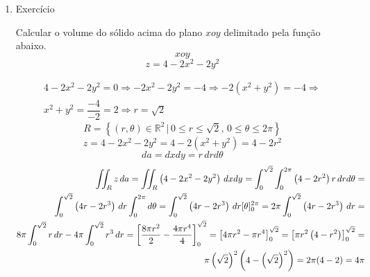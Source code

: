 \begin{enumerate}
	\item Exercício
	
	Calcular o volume do sólido acima do plano $xoy$ delimitado pela função abaixo.
	\begin{equation*}
		xoy
	\end{equation*}
	\begin{equation*}
		z = 4 - 2x^2 - 2y^2
	\end{equation*}
	
	\begin{align*}
		4 - 2x^2 - 2y^2 = 0 \Rightarrow -2x^2 - 2y^2 = - 4 \Rightarrow - 2\left(x^2 + y^2\right) = -4 \Rightarrow\\ x^2 + y^2 = \dfrac{-4}{-2} = 2 \Rightarrow r = \sqrt{2}
	\end{align*}
	\begin{equation*}
		R = \left\{(r, \theta) \in \mathbb{R}^2 \,|\, 0 \leq r \leq \sqrt{2},\, 0 \leq \theta \leq 2\pi\right\}
	\end{equation*}
	\begin{equation*}
		z = 4 - 2x^2 - 2y^2 = 4 - 2\left(x^2 + y^2\right) = 4 - 2r^2
	\end{equation*}
	\begin{equation*}
		da = dxdy = r\, drd\theta
	\end{equation*}
	\begin{align*}
		\iint_R z\, da = \iint_R \left(4 - 2x^2 - 2y^2\right)\, dxdy = \int_0^{\sqrt{2}} \int_0^{2\pi} \left(4 - 2r^2\right) r\, drd\theta =\\ \int_0^{\sqrt{2}} \left(4r - 2r^3\right) \, dr \int_0^{2\pi} d\theta = \int_0^{\sqrt{2}} \left(4r - 2r^3\right) \, dr [\theta]_0^{2\pi} = 2\pi\int_0^{\sqrt{2}} \left(4r - 2r^3\right) \, dr =\\ 8\pi\int_0^{\sqrt{2}} r\, dr - 4\pi\int_0^{\sqrt{2}} r^3\, dr = \left[\dfrac{8\pi r^2}{2} - \dfrac{\overstrike{4}\pi r^4}{\overstrike{4}}\right]_0^{\sqrt{2}} = \left[4\pi r^2 - \pi r^4\right]_0^{\sqrt{2}} = \left[\pi r^2\left(4 - r^2\right)\right]_0^{\sqrt{2}} =\\ \pi \left(\sqrt{2}\right)^2\left(4 - \left(\sqrt{2}\right)^2\right) = 2\pi(4 - 2) = 4\pi
	\end{align*}
\end{enumerate}